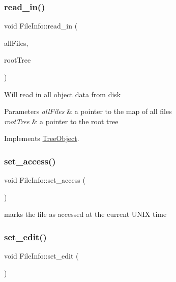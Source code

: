 \subsubsection{\texorpdfstring{read\+\_\+in()}{read\_in()}}
{\footnotesize\ttfamily void File\+Info\+::read\+\_\+in (\begin{DoxyParamCaption}\item[{unordered\+\_\+multimap$<$ string, \mbox{\hyperlink{classFileInfo}{File\+Info}} $\ast$$>$ $\ast$}]{all\+Files,  }\item[{\mbox{\hyperlink{classRootTree}{Root\+Tree}} $\ast$}]{root\+Tree }\end{DoxyParamCaption})\hspace{0.3cm}{\ttfamily [virtual]}}

Will read in all object data from disk 
\begin{DoxyParams}{Parameters}
{\em all\+Files} & a pointer to the map of all files \\
\hline
{\em root\+Tree} & a pointer to the root tree \\
\hline
\end{DoxyParams}


Implements \mbox{\hyperlink{classTreeObject_a722eb00e6782626281afc8eff92840a4}{Tree\+Object}}.

\mbox{\label{classFileInfo_aacaeadeeb41726f8cbea0b7cb1ff6a22}} 
\subsubsection{\texorpdfstring{set\+\_\+access()}{set\_access()}}
{\footnotesize\ttfamily void File\+Info\+::set\+\_\+access (\begin{DoxyParamCaption}{ }\end{DoxyParamCaption})}

marks the file as accessed at the current U\+N\+IX time \mbox{\label{classFileInfo_a05eb10c6804660ecd47e556c27ecd019}} 
\subsubsection{\texorpdfstring{set\+\_\+edit()}{set\_edit()}}
{\footnotesize\ttfamily void File\+Info\+::set\+\_\+edit (\begin{DoxyParamCaption}{ }\end{DoxyParamCaption})}

